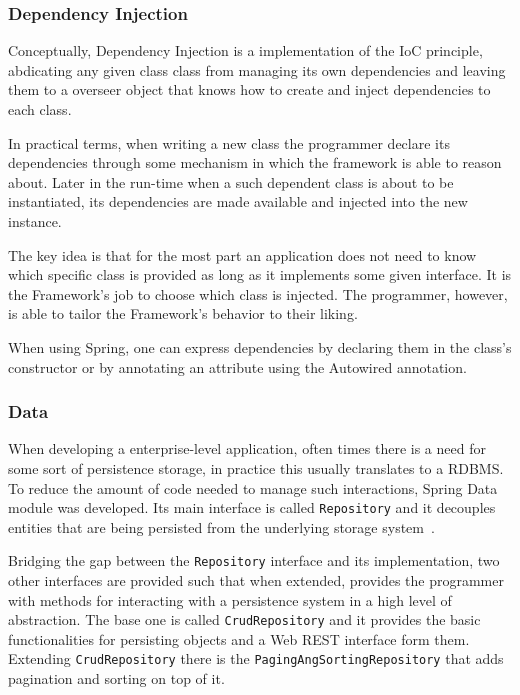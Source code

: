 \subsubsection{Dependency Injection}\label{spring:ds}
Conceptually, Dependency Injection is a implementation of the \gls{IoC} principle, abdicating any given class class from managing its own dependencies and leaving them to a overseer object that knows how to create and inject dependencies to each class\cite{inversion}.

In practical terms, when writing a new class the programmer declare its dependencies through some mechanism in which the framework is able to reason about. Later in the run-time when a such dependent class is about to be instantiated, its dependencies are made available and injected into the new instance.

The key idea is that for the most part an application does not need to know which specific class is provided as long as it implements some given interface. It is the Framework's job to choose which class is injected. The programmer, however, is able to tailor the Framework's behavior to their liking.

When using Spring, one can express dependencies by declaring them in the class's constructor or by annotating an attribute using the Autowired annotation\cite{springdi}.

\subsubsection{Data}
When developing a enterprise-level application, often times there is a need for some sort of persistence storage, in practice this usually translates to a \gls{RDBMS}. To reduce the amount of code needed to manage such interactions, Spring Data module was developed. Its main interface is called \texttt{Repository} and it decouples entities that are being persisted from the underlying storage system~\cite{springdata}.

Bridging the gap between the \texttt{Repository} interface and its implementation, two other interfaces are provided such that when extended, provides the programmer with methods for interacting with a persistence system in a high level of abstraction. The base one is called \texttt{CrudRepository} and it provides the basic functionalities for persisting objects and a Web \gls{REST} interface form them. Extending \texttt{CrudRepository} there is the \texttt{PagingAngSortingRepository} that adds pagination and sorting on top of it.

